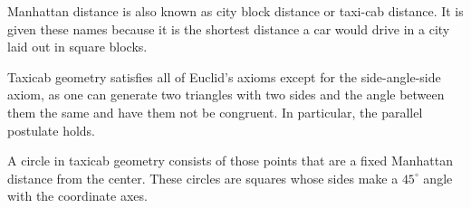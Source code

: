 Manhattan distance is also known as city block distance or taxi-cab distance. It is given these names because it is the shortest distance a car would drive in a city laid out in square blocks. 

Taxicab geometry satisfies all of Euclid's axioms except for the side-angle-side axiom, as one can generate two triangles with two sides and the angle between them the same and have them not be congruent. In particular, the parallel postulate holds.

A circle in taxicab geometry consists of those points that are a fixed Manhattan distance from the center. These circles are squares whose sides make a $45^\circ$ angle with the coordinate axes.

% 
% 
% 
% 
